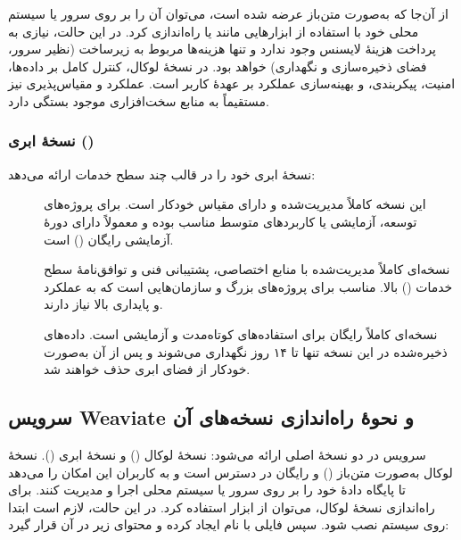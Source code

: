 \documentclass{article}
\begin{document}
از آن‌جا که  به‌صورت متن‌باز عرضه شده است، می‌توان آن را بر روی سرور یا سیستم محلی خود با استفاده از ابزارهایی مانند  یا  راه‌اندازی کرد.
در این حالت، نیازی به پرداخت هزینهٔ لایسنس وجود ندارد و تنها هزینه‌ها مربوط به زیرساخت (نظیر سرور، فضای ذخیره‌سازی و نگهداری) خواهد بود.
در نسخهٔ لوکال، کنترل کامل بر داده‌ها، امنیت، پیکربندی، و بهینه‌سازی عملکرد بر عهدهٔ کاربر است.
عملکرد و مقیاس‌پذیری نیز مستقیماً به منابع سخت‌افزاری موجود بستگی دارد.

\subsubsection{نسخهٔ ابری ()}

 نسخهٔ ابری خود را در قالب چند سطح خدمات ارائه می‌دهد:
\begin{description}
\item[]
این نسخه کاملاً مدیریت‌شده و دارای مقیاس خودکار است.
برای پروژه‌های توسعه، آزمایشی یا کاربردهای متوسط مناسب بوده و معمولاً دارای دورهٔ آزمایشی رایگان () است.

\item[]
نسخه‌ای کاملاً مدیریت‌شده با منابع اختصاصی، پشتیبانی فنی و توافق‌نامهٔ سطح خدمات () بالا.
مناسب برای پروژه‌های بزرگ و سازمان‌هایی است که به عملکرد و پایداری بالا نیاز دارند.

\item[]
نسخه‌ای کاملاً رایگان برای استفاده‌های کوتاه‌مدت و آزمایشی است.
داده‌های ذخیره‌شده در این نسخه تنها تا ۱۴ روز نگهداری می‌شوند و پس از آن به‌صورت خودکار از فضای ابری حذف خواهند شد.

\end{description}

\subsection{سرویس Weaviate و نحوهٔ راه‌اندازی نسخه‌های آن}
سرویس  در دو نسخهٔ اصلی ارائه می‌شود: نسخهٔ لوکال () و نسخهٔ ابری ().
نسخهٔ لوکال به‌صورت متن‌باز () و رایگان در دسترس است و به کاربران این امکان را می‌دهد تا پایگاه دادهٔ خود را بر روی سرور یا سیستم محلی اجرا و مدیریت کنند.
برای راه‌اندازی نسخهٔ لوکال، می‌توان از ابزار  استفاده کرد.
در این حالت، لازم است ابتدا  روی سیستم نصب شود.
سپس فایلی با نام  ایجاد کرده و محتوای زیر در آن قرار گیرد:
\end{document}
